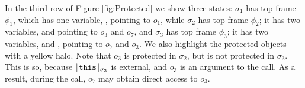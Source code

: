  
In the third row of   Figure \ref{fig:Protected} we show three states: 
 $\sigma_1$ has  top frame $\phi_1$, which has  one variable, , pointing to $o_1$, while 
 $\sigma_2$ has  top frame $\phi_2$; it has two  variables,    and  pointing to $o_3$ and  $o_7$, and 
 $\sigma_3$ has  top frame $\phi_3$; it has two  variables,   and , pointing to $o_7$ and $o_3$.  
% 
We also   highlight the protected objects with a yellow halo.
 Note that $o_3$ is protected in $\sigma_2$, but is not protected in $\sigma_3$. This is so, because $\interpret {\sigma_3} {\prg{this}}$  is external, and  $o_3$ is an argument to the call. As a result, during the call, $o_7$ may obtain direct access to $o_3$. 

